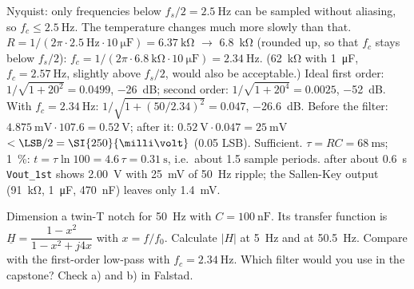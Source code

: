 \begin{solution}
\begin{talist}
\ta Nyquist: only frequencies below $f_s/2 = \SI{2.5}{\hertz}$ can be sampled without aliasing, so $f_c \le \SI{2.5}{\hertz}$.
    The temperature changes much more slowly than that.
\ta $R = 1/(2\pi\cdot\SI{2.5}{\hertz}\cdot\SI{10}{\micro\farad}) = \SI{6.37}{\kilo\ohm}$ $\rightarrow$ \SI{6.8}{\kilo\ohm}
    (rounded up, so that $f_c$ stays below $f_s/2$): $f_c = 1/(2\pi\cdot\SI{6.8}{\kilo\ohm}\cdot\SI{10}{\micro\farad}) = \SI{2.34}{\hertz}$.
    (\SI{62}{\kilo\ohm} with \SI{1}{\micro\farad}, $f_c = \SI{2.57}{\hertz}$, slightly above $f_s/2$, would also be acceptable.)
\ta Ideal first order: $1/\sqrt{1+20^2} = 0.0499$, \SI{-26}{\deci\bel}; second order: $1/\sqrt{1+20^4} = 0.0025$, \SI{-52}{\deci\bel}.
    With $f_c = \SI{2.34}{\hertz}$: $1/\sqrt{1+(50/2.34)^2} = 0.047$, \SI{-26.6}{\deci\bel}.
\os{\newpage}
\ta Before the filter: $\SI{4.875}{\milli\volt}\cdot 107.6 = \SI{0.52}{\volt}$; after it: $\SI{0.52}{\volt}\cdot 0.047 = \SI{25}{\milli\volt}$
    $< \LSB/2 = \SI{250}{\milli\volt}$ (0.05 LSB). Sufficient.
\ta $\tau = RC = \SI{68}{\milli\second}$; \SI{1}{\percent}: $t = \tau\ln 100 = 4.6\,\tau = \SI{0.31}{\second}$, i.e.\ about 1.5 sample periods.
\ta {}\newline after about \SI{0.6}{\second} \texttt{Vout\_1st} shows \SI{2.00}{\volt} with
    \SI{25}{\milli\volt} of \SI{50}{\hertz} ripple; the Sallen-Key output (\SI{91}{\kilo\ohm}, \SI{1}{\micro\farad}, \SI{470}{\nano\farad})
    leaves only \SI{1.4}{\milli\volt}.
\end{talist}
\end{solution}

\label{ex:filt-twint}
\begin{talist}
\ta Dimension a twin-T notch for \SI{50}{\hertz} with $C = \SI{100}{\nano\farad}$.
\ta Its transfer function is $\underline{H} = \dfrac{1-x^2}{1-x^2+j4x}$ with $x = f/f_0$. Calculate $|H|$ at \SI{5}{\hertz} and at \SI{50.5}{\hertz}.
\ta Compare with the first-order low-pass with $f_c = \SI{2.34}{\hertz}$. Which filter would you use in the capstone?
\ta Check a) and b) in Falstad.
\end{talist}

